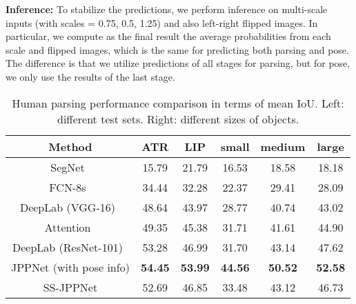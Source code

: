 \documentclass[10pt,journal,compsoc]{IEEEtran}
\begin{document}
\textbf{Inference: }
To stabilize the predictions, we perform inference on multi-scale inputs (with scales = {0.75, 0.5, 1.25}) and also left-right flipped images. In particular, we compute as the final result the average probabilities from each scale and flipped images, which is the same for predicting both parsing and pose. The difference is that we utilize predictions of all stages for parsing, but for pose, we only use the results of the last stage.


\begin{table}[t]
\centering
\scriptsize
\caption{Human parsing performance comparison in terms of mean IoU. Left: different test sets. Right: different sizes of objects.}
\vspace{-3mm}
\label{tab: lip_size}
\begin{tabular}{c|cc|ccc}
\toprule[0.5pt]
Method                                     & ATR     & LIP      & small   & medium   & large     \\ \hline 
SegNet~\cite{badrinarayanan2015segnet}     & 15.79   & 21.79    & 16.53   & 18.58    & 18.18     \\
FCN-8s~\cite{long2014fully}                & 34.44   & 32.28    & 22.37   & 29.41    & 28.09     \\ 
DeepLab (VGG-16)~\cite{chen2016deeplab}     & 48.64   & 43.97    & 28.77   & 40.74    & 43.02    \\
Attention~\cite{chen2015attention}         & 49.35   & 45.38    & 31.71   & 41.61    & 44.90     \\ 
DeepLab (ResNet-101)~\cite{chen2016deeplab} & 53.28   & 46.99    & 31.70   & 43.14    & 47.62    \\ \hline
JPPNet  (with pose info)   & \textbf{54.45} & \textbf{53.99} & \textbf{44.56} & \textbf{50.52} & \textbf{52.58}    \\
SS-JPPNet                            & 52.69   & 46.85    & 33.48   & 43.12    & 46.73     \\
\toprule[0.5pt]
\end{tabular}
\end{table}
\end{document}
